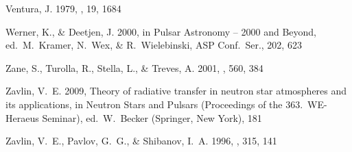 \documentclass{aa}
\begin{document}
\begin{thebibliography}{}
{Ventura}, J. 1979, 
\prd, 19, 1684 
 
{Werner}, K., \& {Deetjen}, J. 2000, in Pulsar Astronomy -- 2000 and Beyond, 
ed.\ M.~Kramer, N.~Wex, \& R.~Wielebinski, 
ASP Conf.\ Ser., 202, 623 
 
Zane, S., Turolla, R., Stella, L., \& Treves, A. 2001, 
\apj, 560, 384 
 
{Zavlin}, V.~E. 2009, Theory of radiative transfer 
in neutron star atmospheres and its applications, 
in Neutron Stars and Pulsars (Proceedings of the 
  363.\ WE-Heraeus Seminar),   
  ed.\ W.~Becker (Springer, New York), 181 
 
{Zavlin}, V.~E., {Pavlov}, G.~G., \& {Shibanov}, I.~A. 1996, \aap, 315, 141 
 
 
\end{thebibliography} 
 
\end{document}
